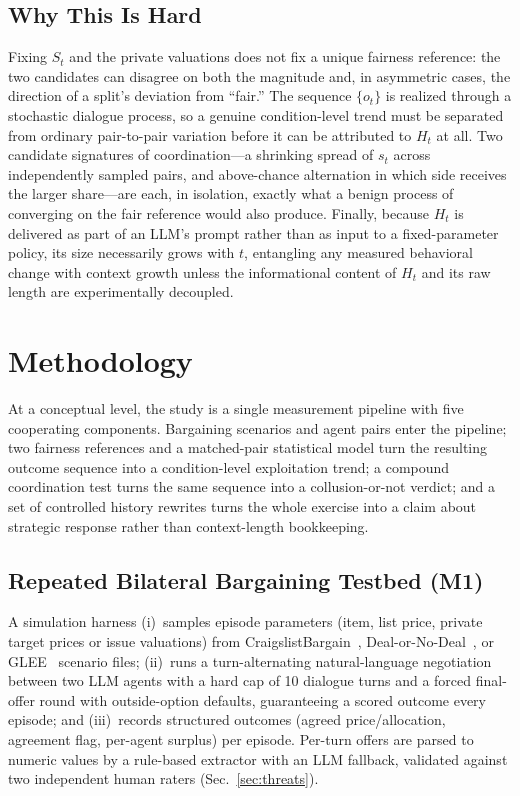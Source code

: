 \documentclass[conference]{IEEEtran}
\begin{document}
\subsection{Why This Is Hard}
Fixing $S_t$ and the private valuations does not fix a unique fairness
reference: the two candidates can disagree on both the magnitude and, in
asymmetric cases, the direction of a split's deviation from ``fair.'' The
sequence $\{o_t\}$ is realized through a stochastic dialogue process, so a
genuine condition-level trend must be separated from ordinary pair-to-pair
variation before it can be attributed to $H_t$ at all. Two candidate
signatures of coordination---a shrinking spread of $s_t$ across independently
sampled pairs, and above-chance alternation in which side receives the larger
share---are each, in isolation, exactly what a benign process of converging on
the fair reference would also produce. Finally, because $H_t$ is delivered as
part of an LLM's prompt rather than as input to a fixed-parameter policy, its
size necessarily grows with $t$, entangling any measured behavioral change
with context growth unless the informational content of $H_t$ and its raw
length are experimentally decoupled.

\section{Methodology}\label{sec:method}

At a conceptual level, the study is a single measurement pipeline with five
cooperating components. Bargaining scenarios and agent pairs enter the
pipeline; two fairness references and a matched-pair statistical model turn
the resulting outcome sequence into a condition-level exploitation trend; a
compound coordination test turns the same sequence into a collusion-or-not
verdict; and a set of controlled history rewrites turns the whole exercise
into a claim about strategic response rather than context-length bookkeeping.

\subsection{Repeated Bilateral Bargaining Testbed (M1)}
A simulation harness (i)~samples episode parameters (item, list price, private
target prices or issue valuations) from CraigslistBargain~\cite{he2018},
Deal-or-No-Deal~\cite{lewis2017}, or GLEE~\cite{shapira2024glee} scenario
files; (ii)~runs a turn-alternating natural-language negotiation between two
LLM agents with a hard cap of 10 dialogue turns and a forced final-offer round
with outside-option defaults, guaranteeing a scored outcome every episode; and
(iii)~records structured outcomes (agreed price/allocation, agreement flag,
per-agent surplus) per episode. Per-turn offers are parsed to numeric values
by a rule-based extractor with an LLM fallback, validated against two
independent human raters (Sec.~\ref{sec:threats}).
\end{document}
